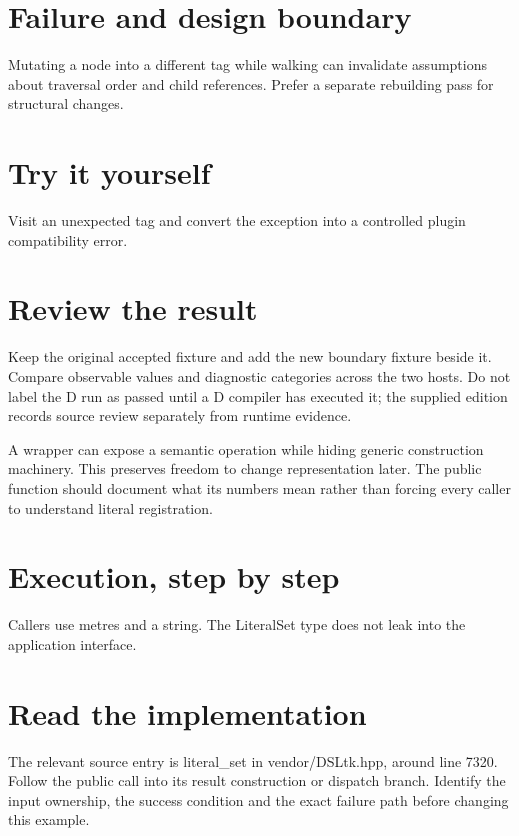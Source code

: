 
\section*{Failure and design boundary}
Mutating a node into a different tag while walking can invalidate assumptions about traversal order and child references. Prefer a separate rebuilding pass for structural changes.

\section*{Try it yourself}
Visit an unexpected tag and convert the exception into a controlled plugin compatibility error.

\section*{Review the result}
Keep the original accepted fixture and add the new boundary fixture beside it. Compare observable values and diagnostic categories across the two hosts. Do not label the D run as passed until a D compiler has executed it; the supplied edition records source review separately from runtime evidence.

\clearpage
{}
A wrapper can expose a semantic operation while hiding generic construction machinery. This preserves freedom to change representation later. The public function should document what its numbers mean rather than forcing every caller to understand literal registration.


\section*{Execution, step by step}
Callers use metres and a string. The LiteralSet type does not leak into the application interface.

\section*{Read the implementation}
The relevant source entry is literal\_set in vendor/DSLtk.hpp, around line 7320. Follow the public call into its result construction or dispatch branch. Identify the input ownership, the success condition and the exact failure path before changing this example.

